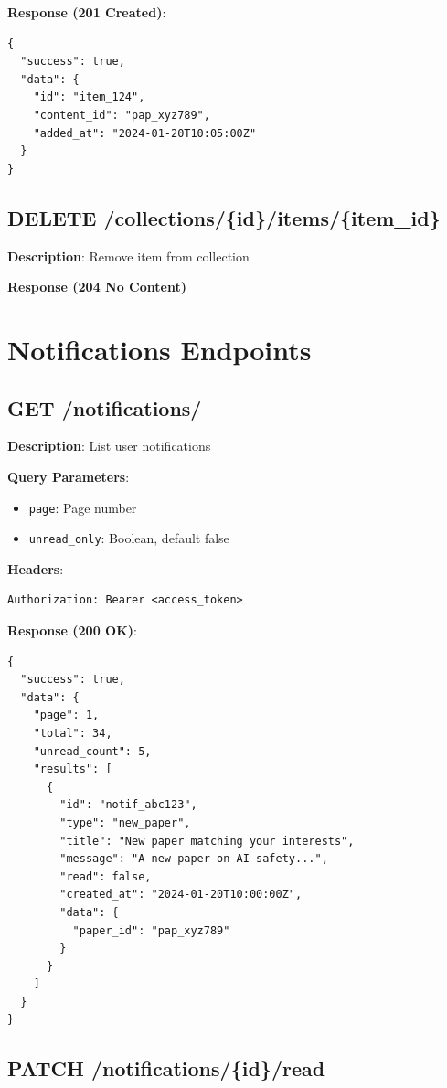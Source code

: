 \documentclass[12pt,a4paper]{report}
\begin{document}
\textbf{Response (201 Created)}:
\begin{lstlisting}
{
  "success": true,
  "data": {
    "id": "item_124",
    "content_id": "pap_xyz789",
    "added_at": "2024-01-20T10:05:00Z"
  }
}
\end{lstlisting}

\section{DELETE /collections/\{id\}/items/\{item\_id\}}

\textbf{Description}: Remove item from collection

\textbf{Response (204 No Content)}

\chapter{Notifications Endpoints}

\section{GET /notifications/}

\textbf{Description}: List user notifications

\textbf{Query Parameters}:
\begin{itemize}
    \item \texttt{page}: Page number
    \item \texttt{unread\_only}: Boolean, default false
\end{itemize}

\textbf{Headers}:
\begin{lstlisting}
Authorization: Bearer <access_token>
\end{lstlisting}

\textbf{Response (200 OK)}:
\begin{lstlisting}
{
  "success": true,
  "data": {
    "page": 1,
    "total": 34,
    "unread_count": 5,
    "results": [
      {
        "id": "notif_abc123",
        "type": "new_paper",
        "title": "New paper matching your interests",
        "message": "A new paper on AI safety...",
        "read": false,
        "created_at": "2024-01-20T10:00:00Z",
        "data": {
          "paper_id": "pap_xyz789"
        }
      }
    ]
  }
}
\end{lstlisting}

\section{PATCH /notifications/\{id\}/read}
\end{document}
